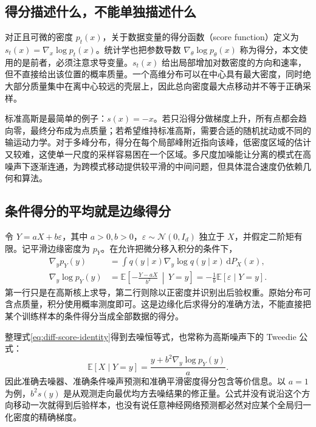 \documentclass[UTF8,12pt,a4paper,fontset=fandol]{ctexart}
\begin{document}
\subsection{得分描述什么，不能单独描述什么}
对正且可微的密度 $p_t(x)$，关于数据变量的得分函数（score function）定义为 $s_t(x)=\nabla_x\log p_t(x)$。统计学也把参数导数 $\nabla_\theta\log p_\theta(x)$ 称为得分，本文使用的是前者，必须注意求导变量。$s_t(x)$ 给出局部增加对数密度的方向和速率，但不直接给出该位置的概率质量。一个高维分布可以在中心具有最大密度，同时绝大部分质量集中在离中心较远的壳层上，因此总向密度最大点移动并不等于正确采样。

标准高斯是最简单的例子：$s(x)=-x$。若只沿得分做梯度上升，所有点都会趋向零，最终分布成为点质量；若希望维持标准高斯，需要合适的随机扰动或不同的输运动力学。对于多峰分布，得分在每个局部峰附近指向该峰，低密度区域的估计又较难，这使单一尺度的采样容易困在一个区域。多尺度加噪能让分离的模式在高噪声下逐渐连通，为跨模式移动提供较平滑的中间问题，但具体混合速度仍依赖几何和算法。

\subsection{条件得分的平均就是边缘得分}
令 $Y=aX+b\varepsilon$，其中 $a>0,b>0$，$\varepsilon\sim\mathcal N(0,I_d)$ 独立于 $X$，并假定二阶矩有限。记平滑边缘密度为 $p_Y$。在允许把微分移入积分的条件下，
\begin{align}
 \nabla_y p_Y(y)
 &=\int q(y\mid x)\nabla_y\log q(y\mid x)\,\mathrm dP_X(x),\nonumber\\
 \nabla_y\log p_Y(y)
 &=\mathbb E\!\left[-\frac{Y-aX}{b^2}\,\middle|\,Y=y\right]
 =-\frac1b\mathbb E[\varepsilon\mid Y=y].
 \label{eq:diff-score-identity}
\end{align}
第一行只是在高斯核上求导，第二行则除以正密度并识别出后验权重。原始分布可含点质量，积分使用概率测度即可。这是边缘化后求得分的准确方法，不能直接把某个训练样本的条件得分当成全部数据的得分。

整理式\eqref{eq:diff-score-identity}得到去噪恒等式，也常称为高斯噪声下的 Tweedie 公式：
\begin{equation}
 \mathbb E[X\mid Y=y]=\frac{y+b^2\nabla_y\log p_Y(y)}{a}.
 \label{eq:diff-tweedie}
\end{equation}
因此准确去噪器、准确条件噪声预测和准确平滑密度得分包含等价信息。以 $a=1$ 为例，$b^2s(y)$ 是从观测走向最优均方去噪结果的修正量。公式并没有说沿这个方向移动一次就得到后验样本，也没有说任意神经网络预测都必然对应某个全局归一化密度的精确梯度。
\end{document}

